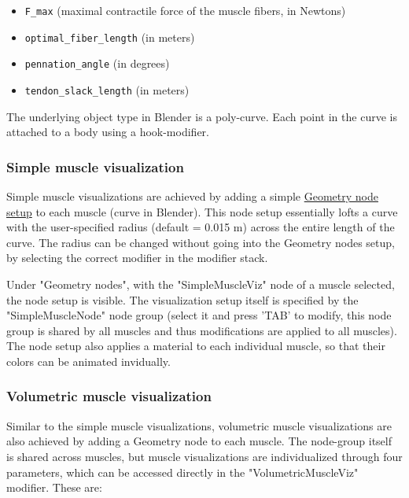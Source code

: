 \documentclass{article}
\begin{document}
\begin{itemize}
    \item \texttt{F\_max} (maximal contractile force of the muscle fibers, in Newtons)
    \item \texttt{optimal\_fiber\_length} (in meters)
    \item \texttt{pennation\_angle} (in degrees)
    \item \texttt{tendon\_slack\_length} (in meters)
\end{itemize}

The underlying object type in Blender is a poly-curve. Each point in the curve is attached to a body using a hook-modifier.

\subsubsection{Simple muscle visualization}
\label{sec:simplemuscleviz}

Simple muscle visualizations are achieved by adding a simple \href{https://docs.blender.org/manual/en/latest/modeling/geometry_nodes/index.html}{Geometry node setup} to each muscle (curve in Blender). This node setup essentially lofts a curve with the user-specified radius (default = 0.015 m) across the entire length of the curve. The radius can be changed without going into the Geometry nodes setup, by selecting the correct modifier in the modifier stack.

Under "Geometry nodes", with the "SimpleMuscleViz" node of a muscle selected, the node setup is visible. The visualization setup itself is specified by the "SimpleMuscleNode" node group (select it and press 'TAB' to modify, this node group is shared by all muscles and thus modifications are applied to all muscles). The node setup also applies a material to each individual muscle, so that their colors can be animated invidually.



\subsubsection{Volumetric muscle visualization}
\label{sec:volmuscleviz}

Similar to the simple muscle visualizations, volumetric muscle visualizations are also achieved by adding a Geometry node to each muscle. The node-group itself is shared across muscles, but muscle visualizations are individualized through four parameters, which can be accessed directly in the "VolumetricMuscleViz" modifier. These are:
\end{document}
